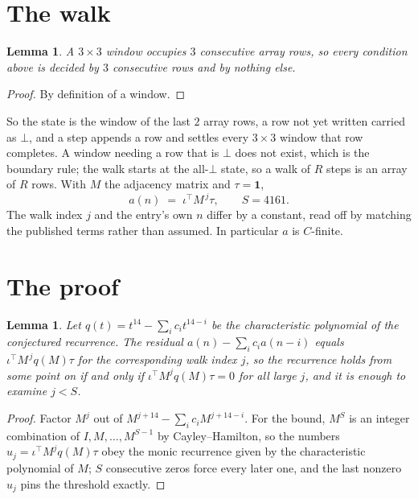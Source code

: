 \documentclass[11pt,a4paper]{article}
\theoremstyle{plain}
\newtheorem{lemma}[theorem]{Lemma}
\theoremstyle{definition}
\begin{document}
\section{The walk}

\begin{lemma}\label{lem:win}
A $3\times3$ window occupies $3$ consecutive array rows, so every condition above is
decided by $3$ consecutive rows and by nothing else.
\end{lemma}

\begin{proof}
By definition of a window.
\end{proof}

So the state is the window of the last $2$ array rows, a row not yet written carried as
$\bot$, and a step appends a row and settles every $3\times3$ window that row completes. A
window needing a row that is $\bot$ does not exist, which is the boundary rule; the walk starts
at the all-$\bot$ state, so a walk of $R$ steps is an array of $R$ rows. With $M$ the adjacency
matrix and $\tau=\mathbf{1}$,
\[
a(n)\;=\;\iota^{\!\top}M^{\,j}\tau ,\qquad S=4161.
\]
The walk index $j$ and the entry's own $n$ differ by a constant, read off by matching the
published terms rather than assumed. In particular $a$ is $C$-finite.

\section{The proof}

\begin{lemma}\label{lem:crit}
Let $q(t)=t^{14}-\sum_i c_it^{14-i}$ be the characteristic polynomial of the
conjectured recurrence. The residual $a(n)-\sum_ic_ia(n-i)$ equals
$\iota^{\!\top}M^{\,j}q(M)\tau$ for the corresponding walk index $j$, so the recurrence
holds from some point on if and only if $\iota^{\!\top}M^{j}q(M)\tau=0$ for all large $j$,
and it is enough to examine $j<S$.
\end{lemma}

\begin{proof}
Factor $M^{j}$ out of $M^{j+14}-\sum_ic_iM^{j+14-i}$. For the bound, $M^{S}$
is an integer combination of $I,M,\dots,M^{S-1}$ by Cayley--Hamilton, so the numbers
$u_j=\iota^{\!\top}M^{j}q(M)\tau$ obey the monic recurrence given by the characteristic
polynomial of $M$; $S$ consecutive zeros force every later one, and the last nonzero $u_j$
pins the threshold exactly.
\end{proof}
\end{document}
